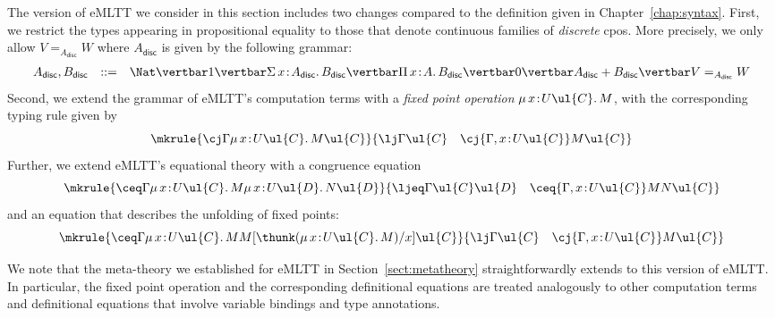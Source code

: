 The version of eMLTT we consider in this section includes two changes compared to the definition given in Chapter~\ref{chap:syntax}. First, we restrict the types appearing in propositional equality to those that denote continuous families of \emph{discrete} cpos. More precisely, we only allow $V =_{A_{\mathsf{disc}}} W$ where $A_{\mathsf{disc}}$ is given by the following grammar:
\[
\begin{array}{r c l}
A_{\mathsf{disc}},B_{\mathsf{disc}} & ::= & \Nat \vertbar 1 \vertbar \Sigma\, x \!:\! A_{\mathsf{disc}} .\, B_{\mathsf{disc}} \vertbar \Pi\, x \!:\! A .\, B_{\mathsf{disc}} \vertbar 0 \vertbar A_{\mathsf{disc}} + B_{\mathsf{disc}} \vertbar V =_{A_{\mathsf{disc}}} W
\end{array}
\]
Second, we extend the grammar of eMLTT's computation terms with a \emph{fixed point operation}  $\mu\, x \!:\! U\ul{C} .\, M$, with the corresponding typing rule given by
\[
\mkrule
{\cj \Gamma {\mu\, x \!:\! U\ul{C} .\, M} {\ul{C}}}
{
\lj \Gamma \ul{C}
\quad
\cj {\Gamma, x \!:\! U\ul{C}} M \ul{C}
}
\]
Further, we extend eMLTT's equational theory with a congruence equation
\[
\mkrule
{\ceq \Gamma {\mu\, x \!:\! U\ul{C} .\, M} {\mu\, x \!:\! U\ul{D} .\, N} \ul{D}}
{\ljeq \Gamma {\ul{C}} {\ul{D}}
\quad
\ceq {\Gamma, x \!:\! U\ul{C}} M N {\ul{C}}}
\]
and an equation that describes the unfolding of fixed points:
\[
\mkrule
{\ceq \Gamma {\mu\, x \!:\! U\ul{C} .\, M} {M[\thunk (\mu\, x \!:\! U\ul{C} .\, M)/x]} {\ul{C}}}
{
\lj \Gamma \ul{C}
\quad
\cj {\Gamma, x \!:\! U\ul{C}} M \ul{C}
}
\]

We note that the meta-theory we established for eMLTT in Section~\ref{sect:metatheory} straightforwardly extends to this version of eMLTT. In particular, the fixed point operation and the corresponding definitional equations are treated analogously to other computation terms and definitional equations that involve variable bindings and type annotations. 

